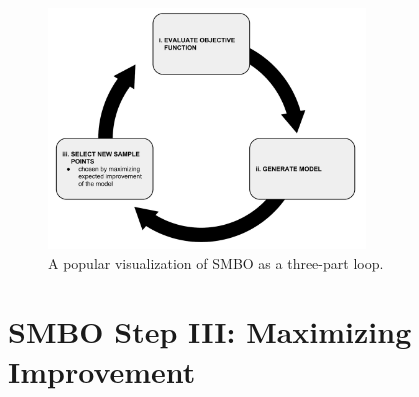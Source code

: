 \begin{figure}[h]
	\centering
	\includegraphics[width=0.75\textwidth]{images/smbo_loop}
	\caption{A popular visualization of SMBO as a three-part loop.}
	\label{fig:smbo_cycle}

\end{figure}




\section{SMBO Step III: Maximizing Improvement}\label{sec:max_imp}

